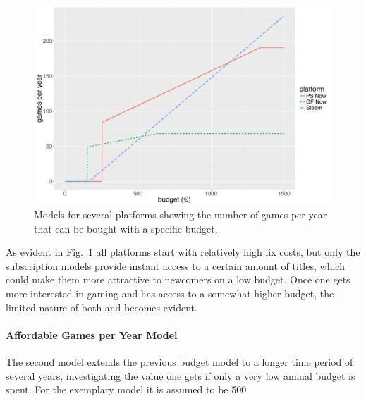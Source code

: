 \begin{figure}[!t]
	\centering
	\includegraphics[width=1.0\columnwidth]{images/gamesperyear-over-budget.pdf}
	\caption{Models for several platforms showing the number of games per year that can be bought with a specific budget.}
\label{fig:gamesperyear-over-budget}
\end{figure}

As evident in Fig.~\ref{fig:gamesperyear-over-budget} all platforms start with relatively high fix costs, but only the subscription models provide instant access to a certain amount of titles, which could make them more attractive to newcomers on a low budget. Once one gets more interested in gaming and has access to a somewhat higher budget, the limited nature of both \psnow and \gfnow becomes evident.


\paragraph{Affordable Games per Year Model}

The second model extends the previous budget model to a longer time period of several years, investigating the value one gets if only a very low annual budget is spent. For the exemplary model it is assumed to be \SI{500}{\EUR}

